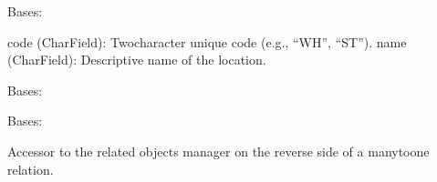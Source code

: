 \documentclass[a4paper,11pt,spanish]{sphinxmanual}
\begin{document}
\begin{fulllineitems}
\label{\detokenize{api/inventory/inventory.models:inventory.models.Location}}
\pysigstartsignatures
\pysiglinewithargsret
{}
{\sphinxparamcomma {}}
{}
\pysigstopsignatures
\sphinxAtStartPar
Bases: 
\begin{description}
\sphinxAtStartPar
code (CharField): Two\sphinxhyphen{}character unique code (e.g., “WH”, “ST”).
name (CharField): Descriptive name of the location.

\end{description}

\begin{fulllineitems}
\label{\detokenize{api/inventory/inventory.models:inventory.models.Location.DoesNotExist}}
\pysigstartsignatures
\pysigline
{}
\pysigstopsignatures
\sphinxAtStartPar
Bases: 

\end{fulllineitems}


\begin{fulllineitems}
\label{\detokenize{api/inventory/inventory.models:inventory.models.Location.MultipleObjectsReturned}}
\pysigstartsignatures
\pysigline
{}
\pysigstopsignatures
\sphinxAtStartPar
Bases: 

\end{fulllineitems}


\begin{fulllineitems}
\label{\detokenize{api/inventory/inventory.models:inventory.models.Location.cash_sessions}}
\pysigstartsignatures
\pysigline
{}
\pysigstopsignatures
\sphinxAtStartPar
Accessor to the related objects manager on the reverse side of a
many\sphinxhyphen{}to\sphinxhyphen{}one relation.


\end{fulllineitems}
\end{fulllineitems}
\end{document}
